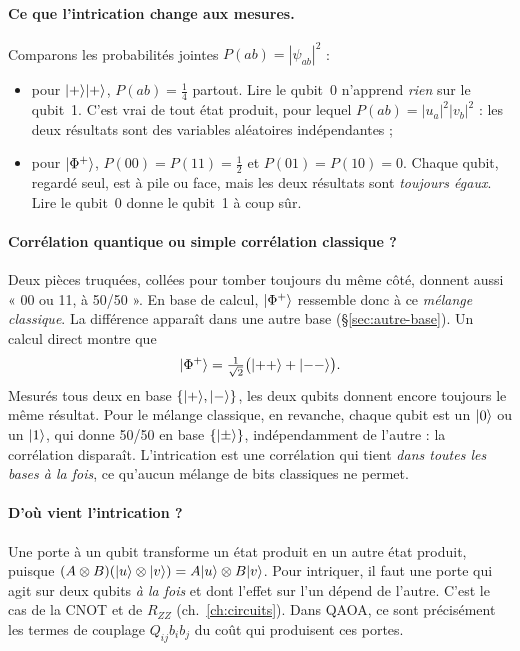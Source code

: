 \paragraph{Ce que l'intrication change aux mesures.} Comparons les probabilités jointes $P(ab)=|\psi_{ab}|^2$ :
\begin{itemize}
\item pour $\lvert +\rangle\lvert +\rangle$, $P(ab)=\tfrac14$ partout. Lire le qubit~0 n'apprend \emph{rien} sur le qubit~1. C'est vrai de tout état produit, pour lequel $P(ab)=|u_a|^2|v_b|^2$ : les deux résultats sont des variables aléatoires indépendantes ;
\item pour $\lvert \Phi^+\rangle$, $P(00)=P(11)=\tfrac12$ et $P(01)=P(10)=0$. Chaque qubit, regardé seul, est à pile ou face, mais les deux résultats sont \emph{toujours égaux}. Lire le qubit~0 donne le qubit~1 à coup sûr.
\end{itemize}

\paragraph{Corrélation quantique ou simple corrélation classique ?} Deux pièces truquées, collées pour tomber toujours du même côté, donnent aussi « 00 ou 11, à 50/50 ». En base de calcul, $\lvert \Phi^+\rangle$ ressemble donc à ce \emph{mélange classique}. La différence apparaît dans une autre base (§\ref{sec:autre-base}). Un calcul direct montre que
\[
\lvert \Phi^+\rangle=\tfrac1{\sqrt2}\big(\lvert ++\rangle+\lvert --\rangle\big).
\]
Mesurés tous deux en base $\{\lvert +\rangle,\lvert -\rangle\}$, les deux qubits donnent encore toujours le même résultat. Pour le mélange classique, en revanche, chaque qubit est un $\lvert 0\rangle$ ou un $\lvert 1\rangle$, qui donne 50/50 en base $\{\lvert \pm\rangle\}$, indépendamment de l'autre : la corrélation disparaît. L'intrication est une corrélation qui tient \emph{dans toutes les bases à la fois}, ce qu'aucun mélange de bits classiques ne permet.

\paragraph{D'où vient l'intrication ?} Une porte à un qubit transforme un état produit en un autre état produit, puisque $(A\otimes B)(\lvert u\rangle\otimes\lvert v\rangle)=A\lvert u\rangle\otimes B\lvert v\rangle$. Pour intriquer, il faut une porte qui agit sur deux qubits \emph{à la fois} et dont l'effet sur l'un dépend de l'autre. C'est le cas de la CNOT et de $R_{ZZ}$ (ch.~\ref{ch:circuits}). Dans QAOA, ce sont précisément les termes de couplage $Q_{ij}b_ib_j$ du coût qui produisent ces portes.

